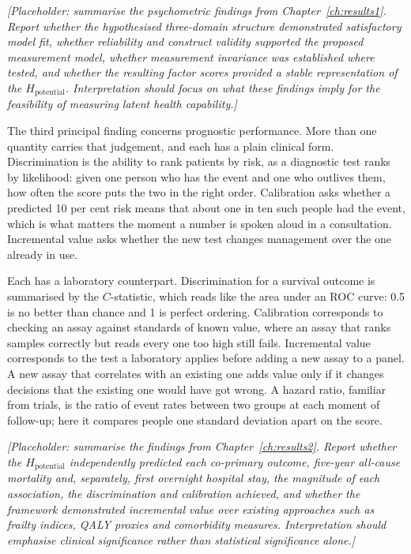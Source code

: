 \medskip
\noindent\emph{[Placeholder: summarise the psychometric findings from Chapter~\ref{ch:results1}. Report whether the hypothesised three-domain structure demonstrated satisfactory model fit, whether reliability and construct validity supported the proposed measurement model, whether measurement invariance \citep{meredith_1993,vandenberg_lance_2000} was established where tested, and whether the resulting factor scores provided a stable representation of the $H_{\text{potential}}$. Interpretation should focus on what these findings imply for the feasibility of measuring latent health capability.]}

The third principal finding concerns prognostic performance. More than one
quantity carries that judgement, and each has a plain clinical form.
Discrimination is the ability to rank patients by risk, as a diagnostic test
ranks by likelihood: given one person who has the event and one who outlives
them, how often the score puts the two in the right order. Calibration asks whether a predicted
10 per cent risk means that about one in ten such people had the event, which is
what matters the moment a number is spoken aloud in a consultation. Incremental
value asks whether the new test changes management over the one already in use.

Each has a laboratory counterpart. Discrimination for a survival outcome is
summarised by the $C$-statistic, which reads like the area under an ROC curve: 0.5
is no better than chance and 1 is perfect ordering. Calibration corresponds to
checking an assay against standards of known value, where an assay that ranks
samples correctly but reads every one too high still fails. Incremental
value corresponds to the test a laboratory applies before adding a new assay to a
panel. A new assay that correlates with an existing one adds value only if it
changes decisions that the existing one would have got wrong. A hazard ratio,
familiar from trials, is the ratio of event rates between two groups at each
moment of follow-up; here it compares people one standard deviation apart on the
score.

\medskip
\noindent\emph{[Placeholder: summarise the findings from Chapter~\ref{ch:results2}. Report whether the $H_{\text{potential}}$ independently predicted each co-primary outcome, five-year all-cause mortality and, separately, first overnight hospital stay, the magnitude of each association, the discrimination and calibration achieved, and whether the framework demonstrated incremental value over existing approaches such as frailty indices, QALY proxies \citep{whitehead_2010,drummond2015} and comorbidity measures. Interpretation should emphasise clinical significance rather than statistical significance alone.]}

